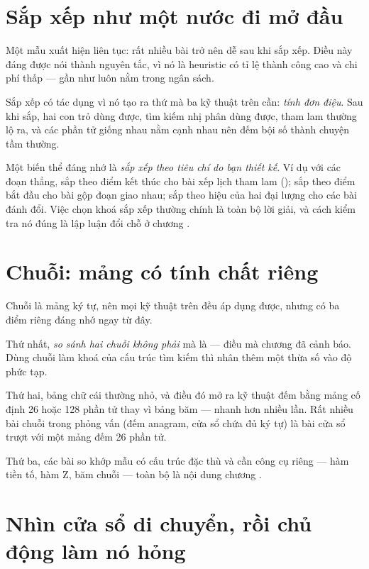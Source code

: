 \documentclass[../../algorithm.tex]{subfiles}
\begin{document}
\section{Sắp xếp như một nước đi mở đầu}

Một mẫu xuất hiện liên tục: rất nhiều bài trở nên dễ sau khi sắp xếp. Điều này đáng được nói thành nguyên tắc, vì nó là heuristic có tỉ lệ thành công cao và chi phí thấp ---  gần như luôn nằm trong ngân sách.

Sắp xếp có tác dụng vì nó tạo ra thứ mà ba kỹ thuật trên cần: \emph{tính đơn điệu}. Sau khi sắp, hai con trỏ dùng được, tìm kiếm nhị phân dùng được, tham lam thường lộ ra, và các phần tử giống nhau nằm cạnh nhau nên đếm bội số thành chuyện tầm thường.

Một biến thể đáng nhớ là \emph{sắp xếp theo tiêu chí do bạn thiết kế}. Ví dụ với các đoạn thẳng, sắp theo điểm kết thúc cho bài xếp lịch tham lam (); sắp theo điểm bắt đầu cho bài gộp đoạn giao nhau; sắp theo hiệu của hai đại lượng cho các bài đánh đổi. Việc chọn khoá sắp xếp thường chính là toàn bộ lời giải, và cách kiểm tra nó đúng là lập luận đổi chỗ ở chương .

\section{Chuỗi: mảng có tính chất riêng}

Chuỗi là mảng ký tự, nên mọi kỹ thuật trên đều áp dụng được, nhưng có ba điểm riêng đáng nhớ ngay từ đây.

Thứ nhất, \emph{so sánh hai chuỗi không phải } mà là  --- điều mà chương  đã cảnh báo. Dùng chuỗi làm khoá của cấu trúc tìm kiếm thì nhân thêm một thừa số vào độ phức tạp.

Thứ hai, bảng chữ cái thường nhỏ, và điều đó mở ra kỹ thuật đếm bằng mảng cố định 26 hoặc 128 phần tử thay vì bảng băm --- nhanh hơn nhiều lần. Rất nhiều bài chuỗi trong phỏng vấn (đếm anagram, cửa sổ chứa đủ ký tự) là bài cửa sổ trượt với một mảng đếm 26 phần tử.

Thứ ba, các bài so khớp mẫu có cấu trúc đặc thù và cần công cụ riêng --- hàm tiền tố, hàm Z, băm chuỗi --- toàn bộ là nội dung chương .


\section{Nhìn cửa sổ di chuyển, rồi chủ động làm nó hỏng}
\end{document}
